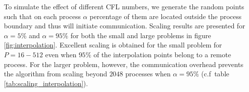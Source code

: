 To simulate the effect of different CFL numbers, we generate the random points such that on each process $\alpha$ percentage of them are located outside the process boundary and thus will initiate communication. Scaling results are presented for $\alpha = 5 \%$ and $\alpha = 95\%$ for both the small and large problems in figure \ref{fig:interpolation}. Excellent scaling is obtained for the small problem for $P = 16-512$ even when $95\%$ of the interpolation points belong to a remote process. For the larger problem, however, the communication overhead prevents the algorithm from scaling beyond $2048$ processes when $\alpha = 95\%$ (c.f\ table \ref{tab:scaling_interpolation}). 
\begin{figure}[htbp]
	\begin{center}
		\\

\end{center}
\end{figure}

